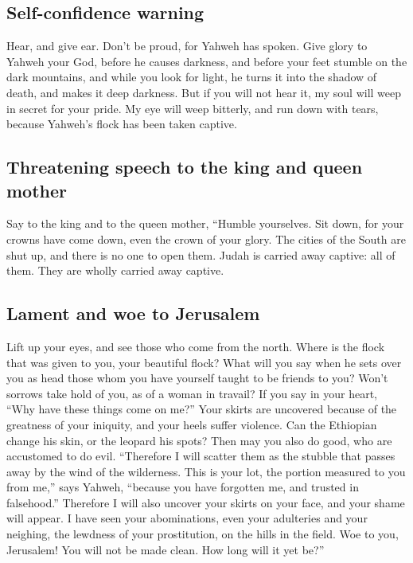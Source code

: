 \hypertarget{self-confidence-warning}{%
\subsection{Self-confidence warning}\label{self-confidence-warning}}

 Hear, and give ear. Don't be proud, for Yahweh has
spoken.  Give glory to Yahweh your God, before he causes
darkness, and before your feet stumble on the dark mountains, and while
you look for light, he turns it into the shadow of death, and makes it
deep darkness.  But if you will not hear it, my soul will
weep in secret for your pride. My eye will weep bitterly, and run down
with tears, because Yahweh's flock has been taken captive.

\hypertarget{threatening-speech-to-the-king-and-queen-mother}{%
\subsection{Threatening speech to the king and queen
mother}\label{threatening-speech-to-the-king-and-queen-mother}}

 Say to the king and to the queen mother, ``Humble
yourselves. Sit down, for your crowns have come down, even the crown of
your glory.  The cities of the South are shut up, and
there is no one to open them. Judah is carried away captive: all of
them. They are wholly carried away captive.

\hypertarget{lament-and-woe-to-jerusalem}{%
\subsection{Lament and woe to
Jerusalem}\label{lament-and-woe-to-jerusalem}}

 Lift up your eyes, and see those who come from the
north. Where is the flock that was given to you, your beautiful flock?
 What will you say when he sets over you as head those
whom you have yourself taught to be friends to you? Won't sorrows take
hold of you, as of a woman in travail?  If you say in
your heart, ``Why have these things come on me?'' Your skirts are
uncovered because of the greatness of your iniquity, and your heels
suffer violence.  Can the Ethiopian change his skin, or
the leopard his spots? Then may you also do good, who are accustomed to
do evil.  ``Therefore I will scatter them as the stubble
that passes away by the wind of the wilderness.  This is
your lot, the portion measured to you from me,'' says Yahweh, ``because
you have forgotten me, and trusted in falsehood.'' 
Therefore I will also uncover your skirts on your face, and your shame
will appear.  I have seen your abominations, even your
adulteries and your neighing, the lewdness of your prostitution, on the
hills in the field. Woe to you, Jerusalem! You will not be made clean.
How long will it yet be?''


